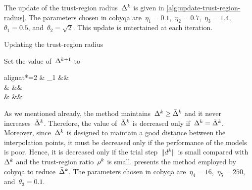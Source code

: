 The update of the trust-region radius~$\rad[k]$ is given in \cref{alg:update-trust-region-radius}.
The parameters chosen in \gls{cobyqa} are~$\eta_1 = 0.1$,~$\eta_2 = 0.7$,~$\eta_3 = 1.4$,~$\theta_1 = 0.5$, and~$\theta_2 = \sqrt{2}$.
This update is untertained at each iteration.

\begin{algorithm}
    \caption{Updating the trust-region radius}
    \label{alg:update-trust-region-radius}
    \DontPrintSemicolon
    Set the value of~$\rad[k + 1]$ to
    \begin{algoempheq}[left={\rad[k + 1] \gets \empheqlbrace}]{alignat*=2}
        & \theta_1 \rad[k]                                                                      && \quad {}\\
        & \min \set{\theta_1 \rad[k], \norm{\step}}                                               && \quad {}\\
        & \min {}    && \quad {}
    \end{algoempheq}
    \If{$\rad[k + 1] \le \eta_3 \radlb[k]$}{
        $\rad[k + 1] \gets \radlb[k]$\;
    }
\end{algorithm}

As we mentioned already, the method maintains~$\rad[k] \ge \radlb[k]$ and it never increases~$\radlb[k]$.
Therefore, the value of~$\radlb[k]$ is decreased only if~$\rad[k] = \radlb[k]$.
Moreover, since~$\radlb[k]$ is designed to maintain a good distance between the interpolation points, it must be decreased only if the performance of the models is poor.
Hence, it is decreased only if the trial step~$\norm{\step[k]}$ is small compared with~$\rad[k]$ and the trust-region ratio~$\ratio[k]$ is small.
 presents the method employed by \gls{cobyqa} to reduce~$\radlb[k]$.
The parameters chosen in \gls{cobyqa} are~$\eta_4 = 16$,~$\eta_5 = 250$, and~$\theta_3 = 0.1$.

